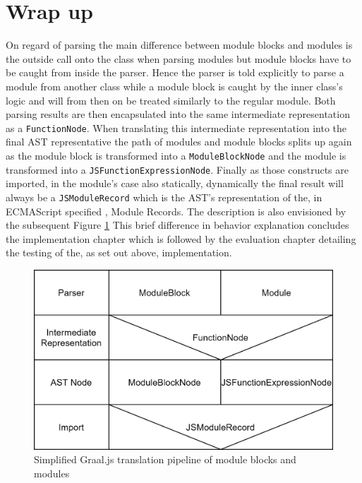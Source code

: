 \section{Wrap up}

On regard of parsing the main difference between module blocks and modules is the outside call onto the class when parsing modules but module blocks have to be caught from inside the parser. Hence the parser is told explicitly to parse a module from another class while a module block is caught by the inner class's logic and will from then on be treated similarly to the regular module. Both parsing results are then encapsulated into the same intermediate representation as a \texttt{FunctionNode}. When translating this intermediate representation into the final AST representative the path of modules and module blocks splits up again as the module block is transformed into a \texttt{ModuleBlockNode} and the module is transformed into a \texttt{JSFunctionExpressionNode}. Finally as those constructs are imported, in the module's case also statically, dynamically the final result will always be a \texttt{JSModuleRecord} which is the AST's representation of the, in ECMAScript specified \cite{ecma}, Module Records. The description is also envisioned by the subsequent Figure \ref{fig:blockVSmodule} This brief difference in behavior explanation concludes the implementation chapter which is followed by the evaluation chapter detailing the testing of the, as set out above, implementation.

\begin{figure}[h!]
    \centering
    \includegraphics[scale=0.165]{figures/ModuleBlockVSModule.png}
    \caption{Simplified Graal.js translation pipeline of module blocks and modules}
    \label{fig:blockVSmodule}
\end{figure}